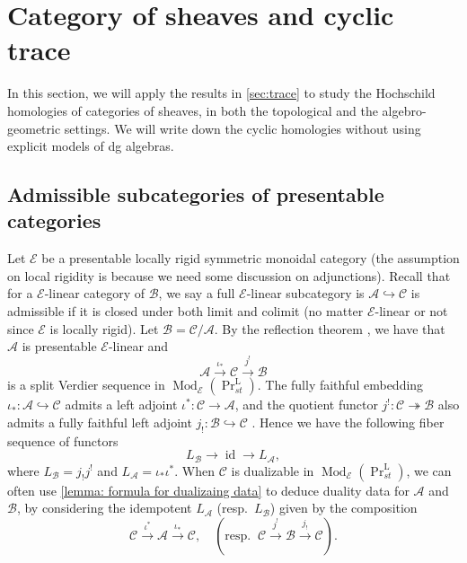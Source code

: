 \documentclass[11pt]{amsart}
\numberwithin{equation}{section}
\theoremstyle{plain}
\theoremstyle{definition}
\theoremstyle{remark}
\newcommand{\cA} { {\mathcal{A}}}
\newcommand{\cB} { {\mathcal{B}}}
\newcommand{\cC} { {\mathcal{C}}}
\newcommand{\cE} { {\mathcal{E}}}
\newcommand{\id}{{\operatorname{id}}}
\newcommand{\Mod}{{\operatorname{Mod}}}
\newcommand\PrLst{  {  \operatorname{Pr}^{\operatorname{L} }_{st} } }
\begin{document}
    






\section{Category of sheaves and cyclic trace}\label{sec:cat-of-sheaf}

In this section, we will apply the results in \autoref{sec:trace} to study the Hochschild homologies of categories of sheaves, in both the topological and the algebro-geometric settings. We will write down the cyclic homologies without using explicit models of dg algebras.

\subsection{Admissible subcategories of presentable categories}

Let $\cE$ be a presentable locally rigid symmetric monoidal category (the assumption on local rigidity is because we need some discussion on adjunctions). Recall that for a $\cE$-linear category of $\cB$, we say a full $\cE$-linear subcategory is $\cA\hookrightarrow \cC$ is admissible if it is closed under both limit and colimit (no matter $\cE$-linear or not since $\cE$ is locally rigid). Let $\cB = \cC/\cA$. By the reflection theorem \cite{Reflection-Theorem-infty}, we have that $\cA$ is presentable $\cE$-linear and
\begin{equation}\label{eq:split-verider}
\cA \xrightarrow{\iota_*} \cC   \xrightarrow{j^!} \cB
\end{equation}
is a split Verdier sequence in $\Mod_\cE(\PrLst)$.
The fully faithful embedding $\iota_*: \cA \hookrightarrow \cC$ admits a left adjoint $\iota^*: \cC \to \cA$, and the quotient functor $j^!: \cC \twoheadrightarrow \cB$ also admits a fully faithful left adjoint $j_!: \cB \hookrightarrow \cC$ \cite[Lemma A.2.5]{Hermitian-K-theory}. Hence we have the following fiber sequence of functors
\begin{equation}L_\cB \longrightarrow \id\longrightarrow L_\cA,
\end{equation}
where $L_\cB = j_!j^!$ and $L_\cA = \iota_* \iota^*$. When $\cC$ is dualizable in $\Mod_\cE(\PrLst)$, we can often use \autoref{lemma: formula for dualizaing data} to deduce duality data for $\cA$ and $\cB$, by considering the idempotent $L_\cA$ (resp.~$L_\cB$) given by the composition
\[\cC \xrightarrow{\iota^*} \cA \xrightarrow{\iota_*} \cC, \quad (\text{resp.} \;\; \cC \xrightarrow{j^!} \cB \xrightarrow{j_!} \cC).
\]
\end{document}
